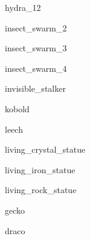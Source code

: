 \documentclass[letterpaper,serif]{module}
\begin{document}
\begin{newmonster}{hydra_12}\end{newmonster}


\begin{newmonster}{insect_swarm_2}\end{newmonster}

\begin{newmonster}{insect_swarm_3}\end{newmonster}

\begin{newmonster}{insect_swarm_4}\end{newmonster}

\begin{newmonster}{invisible_stalker}\end{newmonster}

\begin{newmonster}{kobold}\end{newmonster}

\begin{newmonster}{leech}\end{newmonster}


\begin{newmonster}{living_crystal_statue}\end{newmonster}

\begin{newmonster}{living_iron_statue}\end{newmonster}

\begin{newmonster}{living_rock_statue}\end{newmonster}


\begin{newmonster}{gecko}\end{newmonster}

\begin{newmonster}{draco}\end{newmonster}
\end{document}
